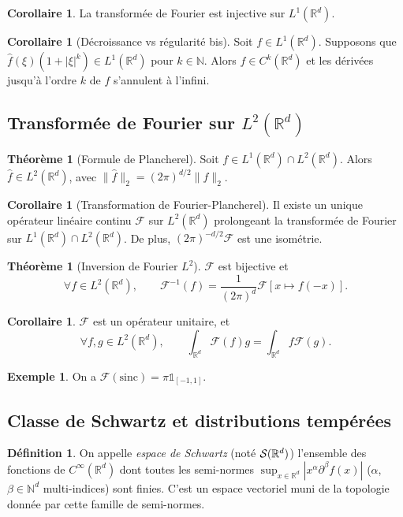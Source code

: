 \documentclass[11pt,a4paper,twocolumn]{article}
\theoremstyle{definition}
\newtheorem{definition}[equation]{Définition}
\newtheorem{example}[equation]{Exemple}
\newtheorem{theorem}[equation]{Théorème}
\newtheorem{corollary}[equation]{Corollaire}
\newcounter{n}
\def\F{\mathbb{F}}
\def\N{\mathbb{N}}
\def\R{\mathbb{R}}
\def\S{{\cal{S}}}
\def\F{\mathcal{F}}
\def\hf{\hat{f}}
\begin{document}
\begin{corollary}
  La transformée de Fourier est injective sur $L^1(\R^d)$.
\end{corollary}

\begin{corollary}[Décroissance vs régularité bis]
  Soit $f \in L^1(\R^d)$. Supposons que $\hf(\xi)(1 + |\xi|^k) \in L^1(\R^d)$
  pour $k \in \N$. Alors $f \in C^k(\R^d)$ et les dérivées jusqu'à l'ordre $k$
  de $f$ s'annulent à l'infini.
\end{corollary}


\subsection{Transformée de Fourier sur $L^2(\R^d)$}

\begin{theorem}[Formule de Plancherel]
  Soit $f \in L^1(\R^d) \cap L^2(\R^d)$. Alors $\hf \in L^2(\R^d)$, avec
  $\|\hf\|_2 = (2\pi)^{d/2} \|f\|_2$.
\end{theorem}

\begin{corollary}[Transformation de Fourier-Plancherel]
  Il existe un unique opérateur linéaire continu $\F$ sur $L^2(\R^d)$
  prolongeant la transformée de Fourier sur $L^1(\R^d) \cap L^2(\R^d)$. De plus,
  $(2\pi)^{-d/2}\F$ est une isométrie.
\end{corollary}

\begin{theorem}[Inversion de Fourier $L^2$]
  $\F$ est bijective et \[ \forall f \in L^2(\R^d), \qquad \F^{-1}(f) =
    \frac{1}{(2\pi)^d}\F[x \mapsto f(-x)]. \]
\end{theorem}

\begin{corollary}
  $\F$ est un opérateur unitaire, et
  \[ \forall f, g \in L^2(\R^d), \qquad \int_{\R^d} \F(f)g = \int_{\R^d}
    f\F(g).\]
\end{corollary}

\begin{example}
  On a $\F(\mathrm{sinc}) = \pi \mathbb{1}_{[-1,1]}$.
\end{example}

\subsection{Classe de Schwartz et distributions tempérées}

\begin{definition}
  On appelle \emph{espace de Schwartz} (noté $\S(\R^d)$) l'ensemble des
  fonctions de $C^\infty(\R^d)$ dont toutes les semi-normes $\sup_{x \in \R^d}
  |x^\alpha \partial^{\beta}f(x)|$ ($\alpha$, $\beta \in \N^d$ multi-indices)
  sont finies. C'est un espace vectoriel muni de la topologie donnée par
  cette famille de semi-normes.
\end{definition}
\end{document}
